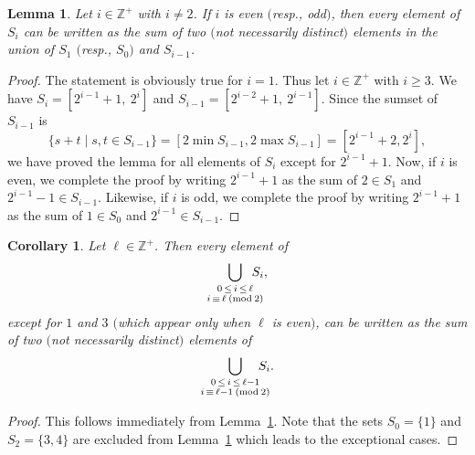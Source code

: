\documentclass[12pt]{amsart}
\newtheorem{lemma}[theorem]{Lemma}
\newtheorem{corollary}[theorem]{Corollary}
\theoremstyle{definition}
\theoremstyle{remark}
\numberwithin{equation}{section}
\numberwithin{figure}{section}
\newcommand{\Z}{\mathbb{Z}}
\begin{document}
\begin{lemma}
\label{lemma:combinations}
    Let $i\in \Z^+$ with $i \neq 2$.
    If $i$ is even $($resp., odd$)$, then every element of $S_i$ can be written as the sum of two $($not necessarily distinct$)$ elements in the union of $S_1$ $($resp., $S_0)$ and $S_{i-1}$.
\end{lemma}

\begin{proof}
    The statement is obviously true for $i=1$. Thus let $i \in \Z^+$ with $i\ge 3$.
    We have $S_i = [2^{i-1} + 1, \: 2^i]$ and $S_{i-1} = [2^{i-2}+1, \: 2^{i-1}]$.
    Since the sumset of $S_{i-1}$ is 
    \[
    \{s+t \mid s,t \in S_{i-1}\} = [2\min S_{i-1}, 2\max S_{i-1}] = [2^{i-1} + 2, 2^i],
    \]
    we have proved the lemma for all elements of $S_i$ except for $2^{i-1}+1$.
    Now, if $i$ is even, we complete the proof by writing $2^{i-1} + 1$ as the sum of $2 \in S_1$ and $2^{i-1}-1 \in S_{i-1}$. %
    Likewise, if $i$ is odd, we complete the proof by writing $2^{i-1} + 1$ as the sum of $1 \in S_0$ and $2^{i-1} \in S_{i-1}$.
\end{proof}

\begin{corollary}
    \label{cor:combinations}
    Let $\ell\in \Z^+$.
    Then every element of
    \[
    \bigcup_{\substack{0\,\le\, i\, \leq\, \ell \\ i\, \equiv\, \ell \: ({\rm mod} \: 2)}} \hspace{-2.5ex} S_i,
    \]
    except for $1$ and $3$ $($which appear only when $\ell$ is even$)$, can be written as the sum of two $($not necessarily distinct$)$ elements of 
    \[
    \bigcup_{\substack{0\,\le\, i\, \leq\, \ell-1 \\ i\, \equiv\, \ell-1 \: ({\rm mod} \: 2)}} \hspace{-2.5ex} S_i.
    \]
\end{corollary}

\begin{proof}
    This follows immediately from Lemma~\ref{lemma:combinations}. %
    Note that the sets $S_0=\{1\}$ and $S_2=\{3,4\}$ are excluded from Lemma~\ref{lemma:combinations} which leads to the exceptional cases.
\end{proof}
\end{document}
